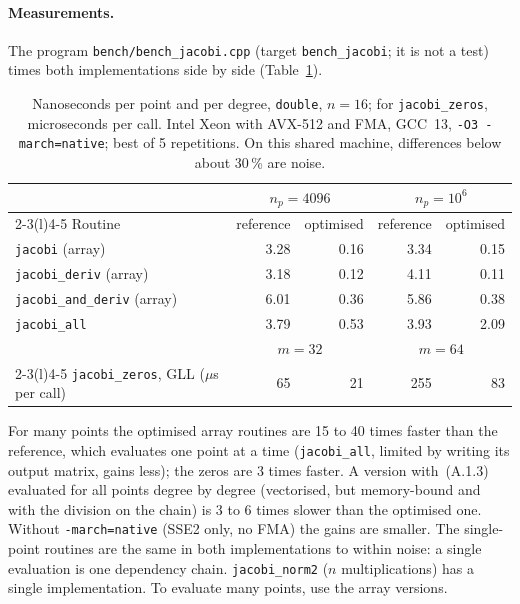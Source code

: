 \documentclass[11pt,a4paper]{article}
\newcommand{\code}[1]{\texttt{#1}}
\begin{document}
\paragraph{Measurements.}
The program \code{bench/bench\_jacobi.cpp} (target \code{bench\_jacobi}; it is
not a test) times both implementations side by side
(Table~\ref{tab:perf}).

\begin{table}[h]
\centering
\small
\begin{tabular}{@{}lrrrr@{}}
\toprule
& \multicolumn{2}{c}{$n_p=4096$} & \multicolumn{2}{c}{$n_p=10^6$} \\
\cmidrule(lr){2-3}\cmidrule(l){4-5}
Routine & reference & optimised & reference & optimised \\
\midrule
\code{jacobi} (array)           & 3.28 & 0.16 & 3.34 & 0.15 \\
\code{jacobi\_deriv} (array)    & 3.18 & 0.12 & 4.11 & 0.11 \\
\code{jacobi\_and\_deriv} (array) & 6.01 & 0.36 & 5.86 & 0.38 \\
\code{jacobi\_all}              & 3.79 & 0.53 & 3.93 & 2.09 \\
\midrule
& \multicolumn{2}{c}{$m=32$} & \multicolumn{2}{c}{$m=64$} \\
\cmidrule(lr){2-3}\cmidrule(l){4-5}
\code{jacobi\_zeros}, GLL ($\mu$s per call) & 65 & 21 & 255 & 83 \\
\bottomrule
\end{tabular}
\caption{Nanoseconds per point and per degree, \code{double}, $n=16$; for
\code{jacobi\_zeros}, microseconds per call.
Intel Xeon with AVX-512 and FMA, GCC~13, \code{-O3 -march=native}; best of 5
repetitions. On this shared machine, differences below about 30\,\% are noise.}
\label{tab:perf}
\end{table}

For many points the optimised array routines are 15 to 40 times faster than
the reference, which evaluates one point at a time (\code{jacobi\_all},
limited by writing its output matrix, gains less); the zeros are 3 times
faster. A version with~(A.1.3) evaluated for all points degree by degree
(vectorised, but memory-bound and with the division on the chain) is 3 to 6
times slower than the optimised one. Without
\code{-march=native} (SSE2 only, no FMA) the gains are smaller. The
single-point routines are the same in both implementations to within noise: a
single evaluation is one dependency chain. \code{jacobi\_norm2} ($n$
multiplications) has a single implementation. To evaluate many points,
use the array versions.
\end{document}
